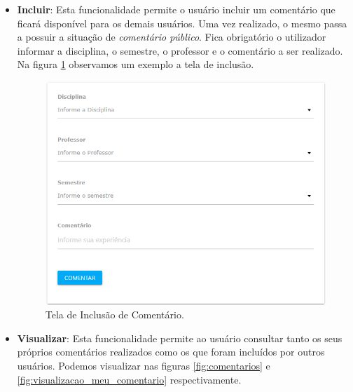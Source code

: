 \documentclass[12pt, a4paper]{report}
\begin{document}
\begin{itemize}
\item \textbf{Incluir}: Esta funcionalidade permite o usuário incluir um comentário que ficará disponível para os demais usuários. Uma vez realizado, o mesmo passa a possuir a situação de \textit{comentário público}. Fica obrigatório o utilizador informar a disciplina, o semestre, o professor e o comentário a ser realizado. Na figura \ref{fig:incluir_comentario} observamos um exemplo a tela de inclusão.

\begin{figure}
\centering
\includegraphics[scale=0.59]{incluir_comentario2.png}
\caption{Tela de Inclusão de Comentário.}
\label{fig:incluir_comentario}
\end{figure}

\item \textbf{Visualizar}: Esta funcionalidade permite ao usuário consultar tanto os seus próprios comentários realizados como os que foram incluídos por outros usuários. Podemos visualizar nas figuras \ref{fig:comentarios} e \ref{fig:visualizacao_meu_comentario} respectivamente.


\end{itemize}
\end{document}
